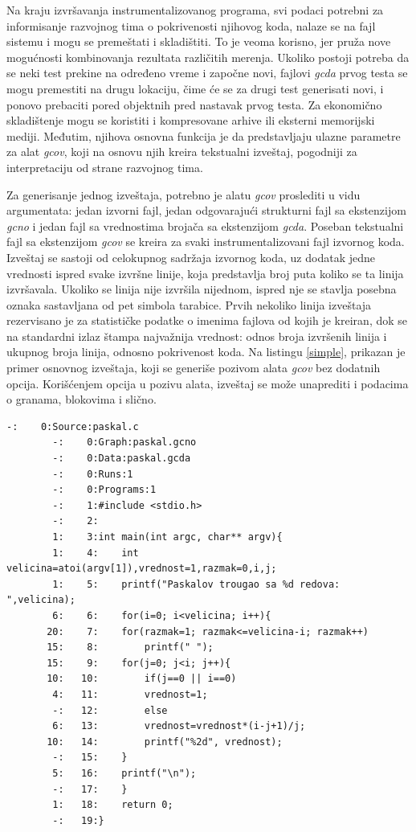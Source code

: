 \documentclass[12pt,oneside]{memoir}
\newcommand{\strano}[1]{\textit{#1}}
\begin{document}
Na kraju izvršavanja instrumentalizovanog programa, svi podaci potrebni za informisanje razvojnog tima o pokrivenosti njihovog koda, nalaze se na fajl sistemu i mogu se premeštati i skladištiti. To je veoma korisno, jer pruža nove mogućnosti kombinovanja rezultata različitih merenja. Ukoliko postoji potreba da se neki test prekine na određeno vreme i započne novi, fajlovi \strano{gcda} prvog testa se mogu premestiti na drugu lokaciju, čime će se za drugi test generisati novi, i ponovo prebaciti pored objektnih pred nastavak prvog testa. Za ekonomično skladištenje mogu se koristiti i kompresovane arhive ili eksterni memorijski mediji. Međutim, njihova osnovna funkcija je da predstavljaju ulazne parametre za alat \strano{gcov}, koji na osnovu njih kreira tekstualni izveštaj, pogodniji za interpretaciju od strane razvojnog tima.

Za generisanje jednog izveštaja, potrebno je alatu \strano{gcov} proslediti u vidu argumentata: jedan izvorni fajl, jedan odgovarajući strukturni fajl sa ekstenzijom \strano{gcno} i jedan fajl sa vrednostima brojača sa ekstenzijom \strano{gcda}. Poseban tekstualni fajl sa ekstenzijom \strano{gcov} se kreira za svaki instrumentalizovani fajl izvornog koda. Izveštaj se sastoji od celokupnog sadržaja izvornog koda, uz dodatak jedne vrednosti ispred svake izvršne linije, koja predstavlja broj puta koliko se ta linija izvršavala. Ukoliko se linija nije izvršila nijednom, ispred nje se stavlja posebna oznaka sastavljana od pet simbola tarabice. Prvih nekoliko linija izveštaja rezervisano je za statističke podatke o imenima fajlova od kojih je kreiran, dok se na standardni izlaz štampa najvažnija vrednost: odnos broja izvršenih linija i ukupnog broja linija, odnosno pokrivenost koda. Na listingu \ref{simple}, prikazan je primer osnovnog izveštaja, koji se generiše pozivom alata \strano{gcov} bez dodatnih opcija. Korišćenjem opcija u pozivu alata, izveštaj se može unaprediti i podacima o granama, blokovima i slično. 
\\

\begin{lstlisting}[caption={Primer osnovnog izveštaja koji generiše \strano{gcov}},frame=single, label=simple]
        -:    0:Source:paskal.c
        -:    0:Graph:paskal.gcno
        -:    0:Data:paskal.gcda
        -:    0:Runs:1
        -:    0:Programs:1
        -:    1:#include <stdio.h>
        -:    2:
        1:    3:int main(int argc, char** argv){
        1:    4:    int velicina=atoi(argv[1]),vrednost=1,razmak=0,i,j;
        1:    5:    printf("Paskalov trougao sa %d redova: ",velicina);
        6:    6:    for(i=0; i<velicina; i++){
       20:    7:	for(razmak=1; razmak<=velicina-i; razmak++)
       15:    8:	    printf(" ");
       15:    9:	for(j=0; j<i; j++){
       10:   10:	    if(j==0 || i==0)
        4:   11:		vrednost=1;
        -:   12:	    else
        6:   13:		vrednost=vrednost*(i-j+1)/j;
       10:   14:	    printf("%2d", vrednost);
        -:   15:	}
        5:   16:	printf("\n");
        -:   17:    }
        1:   18:    return 0;
        -:   19:}
\end{lstlisting}
\end{document}
